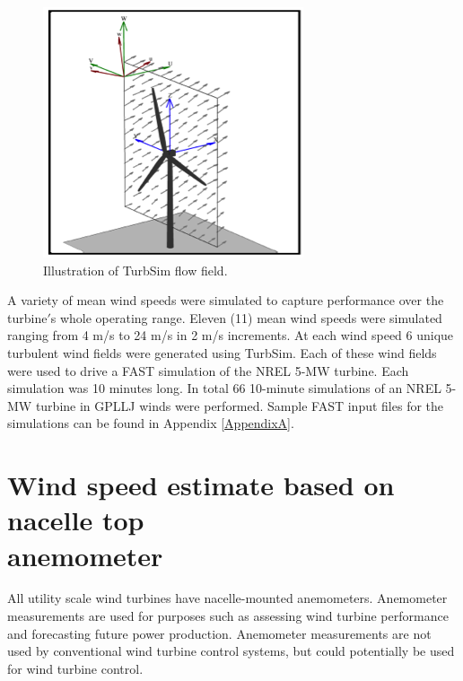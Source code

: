 \begin{figure}[htbp]
	\centering
		\includegraphics[width=.5\linewidth]{Figures/ch2Figures/fig2-2.png}
		
	\caption{Illustration of TurbSim flow field.\cite{jonkman2012}}
	\label{fig2-2}
\end{figure}

A variety of mean wind speeds were simulated to capture performance over the turbine$'$s whole operating range. Eleven (11) mean wind speeds were simulated ranging from 4 m/s to 24 m/s in 2 m/s increments. At each wind speed 6 unique turbulent wind fields were generated using TurbSim. Each of these wind fields were used to drive a FAST simulation of the NREL 5-MW turbine. Each simulation was 10 minutes long. In total 66 10-minute simulations of an NREL 5-MW turbine in GPLLJ winds were performed.  Sample FAST input files for the simulations can be found in Appendix \ref{AppendixA}.






\section{Wind speed estimate based on nacelle top \\
anemometer}\label{section2-3}

All utility scale wind turbines have nacelle-mounted anemometers. Anemometer measurements are used for purposes such as assessing wind turbine performance and forecasting future power production. Anemometer measurements are not used by conventional wind turbine control systems, but could potentially be used for wind turbine control.

